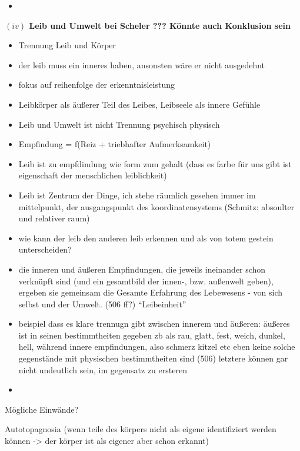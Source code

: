 \documentclass[a4paper, 12pt]{article}
\begin{document}
\begin{onehalfspace}

\begin{itemize}
  \item 
\end{itemize}


\vspace{5mm}
\noindent\textbf{$(iv)$ Leib und Umwelt bei Scheler ??? Könnte auch Konklusion sein}

\begin{itemize}
  \item Trennung Leib und Körper
  \item der leib muss ein inneres haben, ansonsten wäre er nicht ausgedehnt
  \item fokus auf reihenfolge der erkenntnisleistung
  \item Leibkörper als äußerer Teil des Leibes, Leibseele als innere Gefühle
  \item Leib und Umwelt ist nicht Trennung psychisch physisch
  \item Empfindung = f(Reiz + triebhafter Aufmerksamkeit)
  \item Leib ist zu empfdindung wie form zum gehalt (dass es farbe für uns gibt ist eigenschaft der menschlichen leiblichkeit)
  \item Leib ist Zentrum der Dinge, ich stehe räumlich gesehen immer im mittelpunkt, der ausgangspunkt des koordinatensystems (Schmitz: absoulter und relativer raum)
  \item wie kann der leib den anderen leib erkennen und als von totem gestein unterscheiden?
  \item die inneren und äußeren Empfindungen, die jeweils ineinander schon verknüpft sind (und ein gesamtbild der innen-, bzw. außenwelt geben), ergeben sie gemeinsam die Gesamte Erfahrung des Lebewesens - von sich selbst und der Umwelt. (506 ff?) "`Leibeinheit"'
  \item beispiel dass es klare trennugn gibt zwischen innerem und äußeren: äußeres ist in seinen bestimmtheiten gegeben zb als rau, glatt, fest, weich, dunkel, hell, während innere empfindungen, also schmerz kitzel etc eben keine solche gegenstände mit physischen bestimmtheiten sind (506) letztere können gar nicht undeutlich sein, im gegensatz zu ersteren
  \item 
\end{itemize}

Mögliche Einwände?

Autotopagnosia (wenn teile des körpers nicht als eigene identifiziert werden können -> der körper ist als eigener aber schon erkannt)


\end{onehalfspace}
\end{document}
